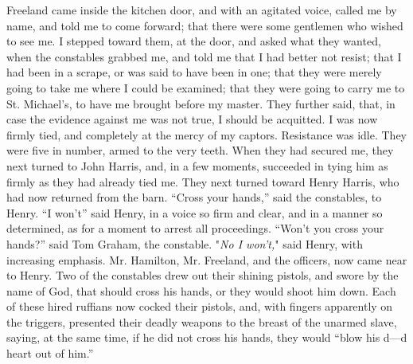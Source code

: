 Freeland came inside the kitchen door, and with an agitated voice,
called me by name, and told me to come forward; that there were some
gentlemen who wished to see me. I stepped toward them, at the door, and
asked what they wanted, when the constables grabbed me, and told me that
I had better not resist; that I had been in a scrape, or was said to
have been in one; that they were merely going to take me where I could
be examined; that they were going to carry me to St. Michael's, to have
me brought before my master. They further said, that, in case the
evidence against me was not true, I should be acquitted. I was now
firmly tied, and completely at the mercy of my captors. Resistance was
idle. They were five in number, armed to the very teeth. When they had
secured me, they next turned to John Harris, and, in a few moments,
succeeded in tying him as firmly as they had already tied me. They next
turned toward Henry Harris, who had now returned from the barn. ``Cross
your hands,'' said the constables, to Henry. ``I won't'' said Henry, in
a voice so firm and clear, and in a manner so determined, as for a
moment to arrest all proceedings. ``Won't you cross your hands?'' said
Tom Graham, the constable. "\emph{No I won't,}" said Henry, with
increasing emphasis. Mr. Hamilton, Mr. Freeland, and the officers, now
came near to Henry. Two of the constables drew out their shining
pistols, and swore by the name of God, that should cross his hands, or
they would shoot him down. Each of these hired ruffians now cocked their
pistols, and, with fingers apparently on the triggers, presented their
deadly weapons to the breast of the unarmed {}slave, saying, at the same
time, if he did not cross his hands, they would ``blow his d---d heart
out of him.''

